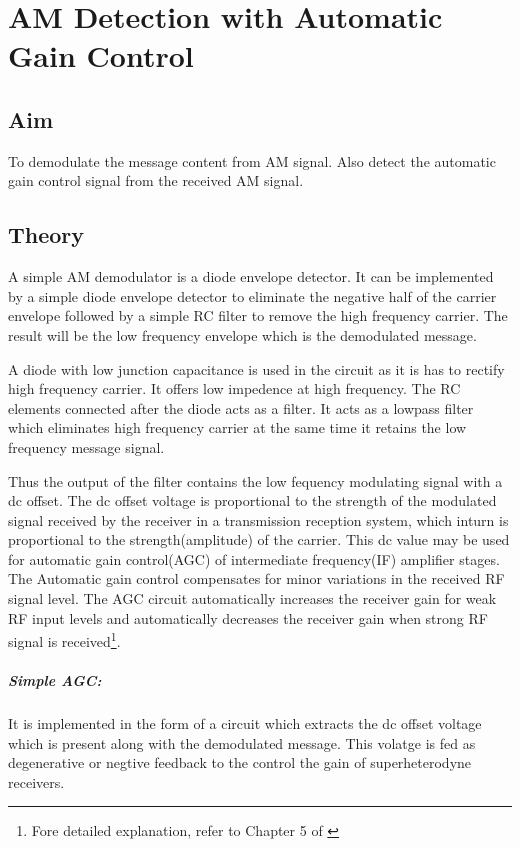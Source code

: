 \chapter[AM Detection with Automatic Gain Control]{AM Detection with Automatic Gain Control}
\label{agcdetect}
\section*{Aim}
To demodulate the message content from AM signal. Also detect the automatic gain control signal from the received AM signal.
\section*{Theory}


A simple AM demodulator is a diode envelope detector. It can be implemented by a simple diode envelope detector to eliminate the negative half of the carrier envelope followed by a simple RC filter to remove the high frequency carrier. The result will be the low frequency envelope which is the demodulated message.

A diode with low junction capacitance is used in the circuit as it is has to rectify high frequency carrier. It offers low impedence at high frequency. The RC elements connected after the diode acts as a filter. It acts as a lowpass filter which eliminates high frequency carrier at the same time it retains the low frequency message signal. 

Thus the output of the filter contains the low fequency modulating signal with a dc offset. The dc offset voltage is proportional to the strength of the modulated signal received by the receiver in a transmission reception system, which inturn is proportional to the strength(amplitude) of the carrier. This dc value may be used for automatic gain control(AGC) of intermediate frequency(IF) amplifier stages. The Automatic gain control compensates for minor variations in the received RF signal level. The AGC circuit automatically increases the receiver gain for weak RF input levels and automatically decreases the receiver gain when strong RF signal is received\footnote{Fore detailed explanation, refer to Chapter 5 of \cite{Tomasi}}.
\paragraph{Simple AGC:} It is implemented in the form of a circuit which extracts the dc offset voltage which is present along with the demodulated message. This volatge is fed as degenerative or negtive feedback to the control the gain of superheterodyne receivers. 
